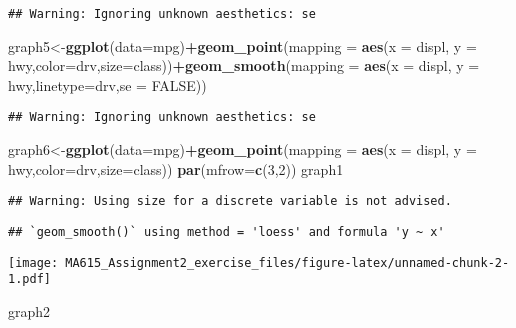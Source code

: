 \documentclass[]{article}
\newenvironment{Shaded}{\begin{snugshade}}{\end{snugshade}}
\newcommand{\KeywordTok}[1]{\textcolor[rgb]{0.13,0.29,0.53}{\textbf{#1}}}
\newcommand{\DataTypeTok}[1]{\textcolor[rgb]{0.13,0.29,0.53}{#1}}
\newcommand{\DecValTok}[1]{\textcolor[rgb]{0.00,0.00,0.81}{#1}}
\newcommand{\OtherTok}[1]{\textcolor[rgb]{0.56,0.35,0.01}{#1}}
\newcommand{\OperatorTok}[1]{\textcolor[rgb]{0.81,0.36,0.00}{\textbf{#1}}}
\newcommand{\NormalTok}[1]{#1}
\begin{document}
\begin{verbatim}
## Warning: Ignoring unknown aesthetics: se
\end{verbatim}

\begin{Shaded}
\begin{Highlighting}[]
\NormalTok{graph5<-}\KeywordTok{ggplot}\NormalTok{(}\DataTypeTok{data=}\NormalTok{mpg)}\OperatorTok{+}\KeywordTok{geom_point}\NormalTok{(}\DataTypeTok{mapping =} \KeywordTok{aes}\NormalTok{(}\DataTypeTok{x =}\NormalTok{ displ, }\DataTypeTok{y =}\NormalTok{ hwy,}\DataTypeTok{color=}\NormalTok{drv,}\DataTypeTok{size=}\NormalTok{class))}\OperatorTok{+}\KeywordTok{geom_smooth}\NormalTok{(}\DataTypeTok{mapping =} \KeywordTok{aes}\NormalTok{(}\DataTypeTok{x =}\NormalTok{ displ, }\DataTypeTok{y =}\NormalTok{ hwy,}\DataTypeTok{linetype=}\NormalTok{drv,}\DataTypeTok{se =} \OtherTok{FALSE}\NormalTok{))}
\end{Highlighting}
\end{Shaded}

\begin{verbatim}
## Warning: Ignoring unknown aesthetics: se
\end{verbatim}

\begin{Shaded}
\begin{Highlighting}[]
\NormalTok{graph6<-}\KeywordTok{ggplot}\NormalTok{(}\DataTypeTok{data=}\NormalTok{mpg)}\OperatorTok{+}\KeywordTok{geom_point}\NormalTok{(}\DataTypeTok{mapping =} \KeywordTok{aes}\NormalTok{(}\DataTypeTok{x =}\NormalTok{ displ, }\DataTypeTok{y =}\NormalTok{ hwy,}\DataTypeTok{color=}\NormalTok{drv,}\DataTypeTok{size=}\NormalTok{class))}
\KeywordTok{par}\NormalTok{(}\DataTypeTok{mfrow=}\KeywordTok{c}\NormalTok{(}\DecValTok{3}\NormalTok{,}\DecValTok{2}\NormalTok{))}
\NormalTok{graph1}
\end{Highlighting}
\end{Shaded}

\begin{verbatim}
## Warning: Using size for a discrete variable is not advised.
\end{verbatim}

\begin{verbatim}
## `geom_smooth()` using method = 'loess' and formula 'y ~ x'
\end{verbatim}

\texttt{[image: MA615\_Assignment2\_exercise\_files/figure-latex/unnamed-chunk-2-1.pdf]}

\begin{Shaded}
\begin{Highlighting}[]
\NormalTok{graph2}
\end{Highlighting}
\end{Shaded}
\end{document}
